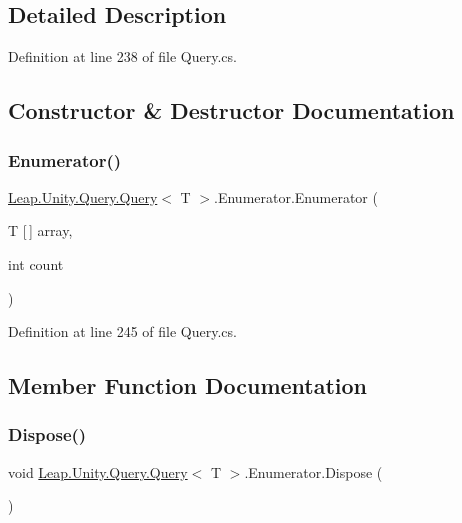 \subsection{Detailed Description}


Definition at line 238 of file Query.\+cs.



\subsection{Constructor \& Destructor Documentation}
\mbox{\label{struct_leap_1_1_unity_1_1_query_1_1_query_1_1_enumerator_af3a50234f50d45d3e42c0d3963586a41}} 
\subsubsection{\texorpdfstring{Enumerator()}{Enumerator()}}
{\footnotesize\ttfamily \mbox{\hyperlink{struct_leap_1_1_unity_1_1_query_1_1_query}{Leap.\+Unity.\+Query.\+Query}}$<$ T $>$.Enumerator.\+Enumerator (\begin{DoxyParamCaption}\item[{T \mbox{[}$\,$\mbox{]}}]{array,  }\item[{int}]{count }\end{DoxyParamCaption})}



Definition at line 245 of file Query.\+cs.



\subsection{Member Function Documentation}
\mbox{\label{struct_leap_1_1_unity_1_1_query_1_1_query_1_1_enumerator_a484f305e44e8eb6174d2dd9d3c8a97e4}} 
\subsubsection{\texorpdfstring{Dispose()}{Dispose()}}
{\footnotesize\ttfamily void \mbox{\hyperlink{struct_leap_1_1_unity_1_1_query_1_1_query}{Leap.\+Unity.\+Query.\+Query}}$<$ T $>$.Enumerator.\+Dispose (\begin{DoxyParamCaption}{ }\end{DoxyParamCaption})}



